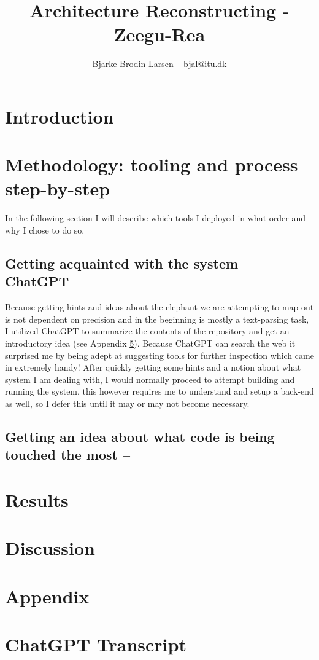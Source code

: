 \documentclass{article}
\title{Architecture Reconstructing - Zeegu-Rea}
\author{Bjarke Brodin Larsen -- bjal@itu.dk}
\begin{document}
\maketitle

\section{Introduction}



\section{Methodology: tooling and process step-by-step}

In the following section I will describe which tools I 
deployed in what order and why I chose to do so.

\subsection{Getting acquainted with the system -- ChatGPT}

Because getting hints and ideas about the elephant we are attempting to 
map out is not dependent on precision and in the beginning is mostly a
text-parsing task, I utilized ChatGPT\cite{gpt4} to summarize the
contents of the repository and get an introductory idea 
(see Appendix \ref{apx:a}).
Because ChatGPT can search the web it surprised me by being adept at 
suggesting tools for further inspection which came in extremely handy!
After quickly getting some hints and a notion about what system I am dealing with,
I would normally proceed to attempt building and running the system,
this however requires me to understand and setup a back-end as well,
so I defer this until it may or may not become necessary.

\subsection{Getting an idea about what code is being touched the most -- }


\subsection{}


\section{Results}


\section{Discussion}





\clearpage
\appendix
\section*{Appendix}

\section{ChatGPT Transcript}
\label{apx:a}

\end{document}
